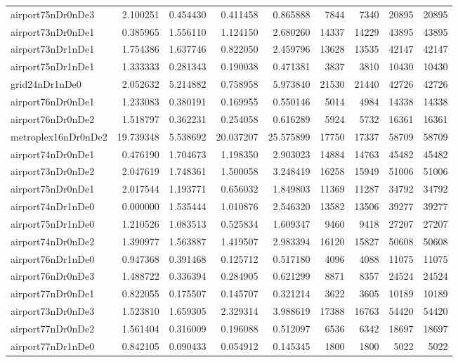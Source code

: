 \begin{longtable}{|l|r|r|r|r|r|r|r|r|}
airport75nDr0nDe3 & 2.100251 & 0.454430 & 0.411458 & 0.865888 & 7844 & 7340 & 20895 & 20895 \\
airport73nDr0nDe1 & 0.385965 & 1.556110 & 1.124150 & 2.680260 & 14337 & 14229 & 43895 & 43895 \\
airport73nDr1nDe1 & 1.754386 & 1.637746 & 0.822050 & 2.459796 & 13628 & 13535 & 42147 & 42147 \\
airport75nDr1nDe1 & 1.333333 & 0.281343 & 0.190038 & 0.471381 & 3837 & 3810 & 10430 & 10430 \\
grid24nDr1nDe0 & 2.052632 & 5.214882 & 0.758958 & 5.973840 & 21530 & 21440 & 42726 & 42726 \\
airport76nDr0nDe1 & 1.233083 & 0.380191 & 0.169955 & 0.550146 & 5014 & 4984 & 14338 & 14338 \\
airport76nDr0nDe2 & 1.518797 & 0.362231 & 0.254058 & 0.616289 & 5924 & 5732 & 16361 & 16361 \\
metroplex16nDr0nDe2 & 19.739348 & 5.538692 & 20.037207 & 25.575899 & 17750 & 17337 & 58709 & 58709 \\
airport74nDr0nDe1 & 0.476190 & 1.704673 & 1.198350 & 2.903023 & 14884 & 14763 & 45482 & 45482 \\
airport73nDr0nDe2 & 2.047619 & 1.748361 & 1.500058 & 3.248419 & 16258 & 15949 & 51006 & 51006 \\
airport75nDr0nDe1 & 2.017544 & 1.193771 & 0.656032 & 1.849803 & 11369 & 11287 & 34792 & 34792 \\
airport74nDr1nDe0 & 0.000000 & 1.535444 & 1.010876 & 2.546320 & 13582 & 13506 & 39277 & 39277 \\
airport75nDr1nDe0 & 1.210526 & 1.083513 & 0.525834 & 1.609347 & 9460 & 9418 & 27207 & 27207 \\
airport74nDr0nDe2 & 1.390977 & 1.563887 & 1.419507 & 2.983394 & 16120 & 15827 & 50608 & 50608 \\
airport76nDr1nDe0 & 0.947368 & 0.391468 & 0.125712 & 0.517180 & 4096 & 4088 & 11075 & 11075 \\
airport76nDr0nDe3 & 1.488722 & 0.336394 & 0.284905 & 0.621299 & 8871 & 8357 & 24524 & 24524 \\
airport77nDr0nDe1 & 0.822055 & 0.175507 & 0.145707 & 0.321214 & 3622 & 3605 & 10189 & 10189 \\
airport73nDr0nDe3 & 1.523810 & 1.659305 & 2.329314 & 3.988619 & 17388 & 16763 & 54420 & 54420 \\
airport77nDr0nDe2 & 1.561404 & 0.316009 & 0.196088 & 0.512097 & 6536 & 6342 & 18697 & 18697 \\
airport77nDr1nDe0 & 0.842105 & 0.090433 & 0.054912 & 0.145345 & 1800 & 1800 & 5022 & 5022 \\

\end{longtable}
